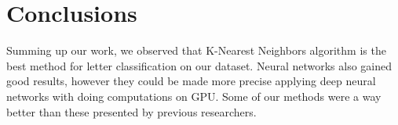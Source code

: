 \chapter*{Conclusions}
Summing up our work, we observed that K-Nearest Neighbors algorithm is the best method for letter
classification on our dataset. Neural networks also gained good results, however they could be made
more precise applying deep neural networks with doing computations on GPU. Some of our methods
were a way better than these presented by previous researchers. 